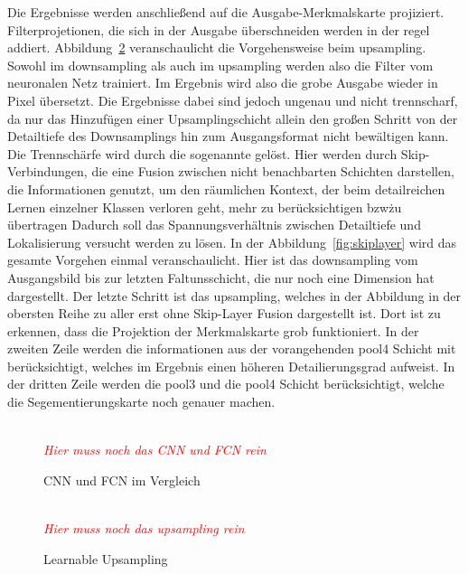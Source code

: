 Die Ergebnisse werden anschließend auf die Ausgabe-Merkmalskarte projiziert.
Filterprojetionen, die sich in der Ausgabe überschneiden werden in der regel addiert.
Abbildung~\ref{fig:upsampling} veranschaulicht die Vorgehensweise beim upsampling.
Sowohl im downsampling als auch im upsampling werden also die Filter vom neuronalen Netz trainiert.
Im Ergebnis wird also die grobe Ausgabe wieder in Pixel übersetzt.
Die Ergebnisse dabei sind jedoch ungenau und nicht trennscharf, da nur das Hinzufügen einer Upsamplingschicht allein
den großen Schritt von der Detailtiefe des Downsamplings hin zum Ausgangsformat nicht bewältigen kann.
Die Trennschärfe wird durch die sogenannte \grqq gelöst.
Hier werden durch Skip-Verbindungen, die eine Fusion zwischen nicht benachbarten Schichten darstellen, die Informationen
genutzt, um den räumlichen Kontext, der beim detailreichen Lernen einzelner Klassen verloren geht, mehr zu
berücksichtigen bzw\. zu übertragen
Dadurch soll das Spannungsverhältnis zwischen Detailtiefe und Lokalisierung versucht werden zu lösen.
In der Abbildung~\ref{fig:skiplayer} wird das gesamte Vorgehen einmal veranschaulicht.
Hier ist das downsampling vom Ausgangsbild bis zur letzten Faltunsschicht, die nur noch eine Dimension hat dargestellt.
Der letzte Schritt ist das upsampling, welches in der Abbildung in der obersten Reihe zu aller erst ohne Skip-Layer
Fusion dargestellt ist.
Dort ist zu erkennen, dass die Projektion der Merkmalskarte grob funktioniert.
In der zweiten Zeile werden die informationen aus der vorangehenden pool4 Schicht mit berücksichtigt, welches im Ergebnis
einen höheren Detailierungsgrad aufweist.
In der dritten Zeile werden die pool3 und die pool4 Schicht berücksichtigt, welche die Segementierungskarte noch genauer
machen.\\



\begin{figure}[H]
    \caption {\ac{CNN} und \ac{FCN} im Vergleich}
    \label{fig:CNN_FCN}
    \\
    \textit{\textcolor{red}{Hier muss noch das CNN und FCN rein}}
    \\
\end{figure}

\begin{figure}[H]
    \caption {Learnable Upsampling}
    \label{fig:upsampling}
    \\
    \textit{\textcolor{red}{Hier muss noch das upsampling rein}}
    \\
\end{figure}

